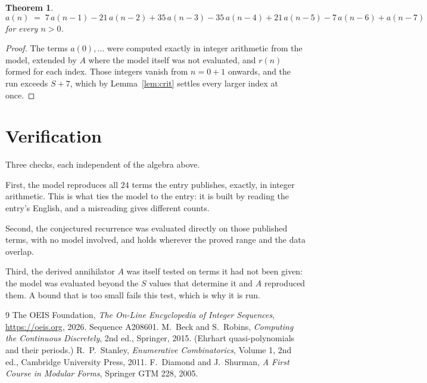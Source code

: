 \documentclass[11pt,a4paper]{article}
\theoremstyle{plain}
\newtheorem{theorem}{Theorem}
\theoremstyle{definition}
\begin{document}
\begin{theorem}
\[
a(n)\;=\;7\,a(n-1) - 21\,a(n-2) + 35\,a(n-3) - 35\,a(n-4) + 21\,a(n-5) - 7\,a(n-6) + a(n-7)
\]
for every $n>0$.
\end{theorem}

\begin{proof}
The terms $a(0),\dots$ were computed exactly in integer arithmetic from the model, extended by
$A$ where the model itself was not evaluated, and $r(n)$ formed for each index. Those integers
vanish from $n=0+1$ onwards, and the run exceeds $S+7$, which by
Lemma~\ref{lem:crit} settles every larger index at once.
\end{proof}

\section{Verification}

Three checks, each independent of the algebra above.

First, the model reproduces all $24$ terms the entry publishes, exactly, in integer
arithmetic. This is what ties the model to the entry: it is built by reading the entry's
English, and a misreading gives different counts.

Second, the conjectured recurrence was evaluated directly on those published terms, with no
model involved, and holds wherever the proved range and the data overlap.

Third, the derived annihilator $A$ was itself tested on terms it had not been given: the model
was evaluated beyond the $S$ values that determine it and $A$ reproduced them. A bound that is
too small fails this test, which is why it is run.

\begin{thebibliography}{9}
 The OEIS Foundation, \emph{The On-Line Encyclopedia of Integer
Sequences}, \url{https://oeis.org}, 2026. Sequence A208601.
 M.~Beck and S.~Robins, \emph{Computing the Continuous Discretely},
2nd ed., Springer, 2015. (Ehrhart quasi-polynomials and their periods.)
 R.~P.~Stanley, \emph{Enumerative Combinatorics}, Volume 1, 2nd ed.,
Cambridge University Press, 2011.
 F.~Diamond and J.~Shurman, \emph{A First Course in Modular Forms},
Springer GTM 228, 2005.
\end{thebibliography}
\end{document}
